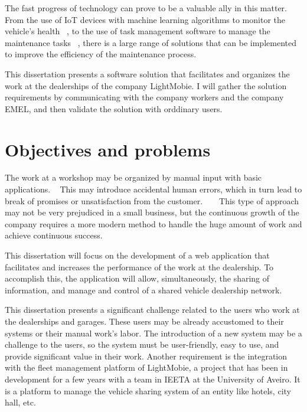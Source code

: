 The fast progress of technology can prove to be a valuable ally in this matter. 
From the use of IoT devices with machine learning algorithms to monitor the vehicle's health ~\cite{Vasavi2021}, 
to the use of task management software to manage the maintenance tasks ~\cite{MAS_MOTORS}, 
there is a large range of solutions that can be implemented to improve the efficiency of the maintenance process.

This dissertation presents a software solution that facilitates and organizes the work at the dealerships of the company LightMobie. I will gather the solution requirements by communicating with the company workers and the company EMEL, and then validate the solution with orddinary users.


\section{Objectives and problems}

The work at a workshop may be organized by manual input with basic applications. ~\cite{MAS_MOTORS} 
This may introduce accidental human errors, which in turn lead to break of promises or unsatisfaction from the customer. ~\cite{MAS_MOTORS} ~\cite{Setting_the_after_sale_process}
This type of approach may not be very prejudiced in a small business, but the continuous growth of the company requires a more modern method to handle the huge amount of work and achieve continuous success. ~\cite{MAS_MOTORS}

This dissertation will focus on the development of a web application that facilitates and increases the performance of the work at the dealership.
To accomplish this, the application will allow, simultaneously, the sharing of information, and manage and control of a shared vehicle dealership network.

This dissertation presents a significant challenge related to the users who work at the dealerships and garages. 
These users may be already accustomed to their systems or their manual work's labor.  
The introduction of a new system may be a challenge to the users, so the system must be user-friendly, easy to use, and provide significant value in their work.
Another requirement is the integration with the fleet management platform of LightMobie, a project that has been in development for a few years with a team in \ac{IEETA} at the University of Aveiro.
It is a platform to manage the vehicle sharing system of an entity like hotels, city hall, etc.  

